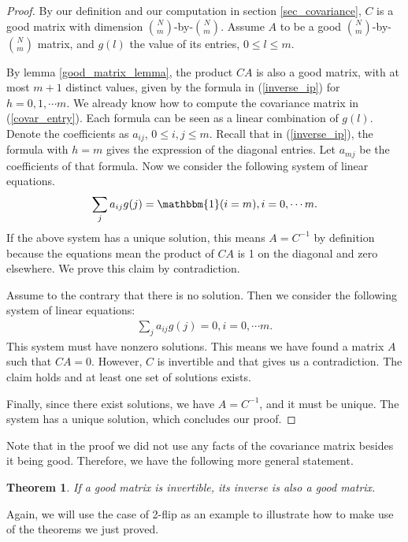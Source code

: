 \documentclass[10pt]{article}
\newtheorem{theorem}{\bf Theorem}
\newenvironment{Proof of lemma}{\noindent{\bf Proof of Lemma}}{\hfill$\Box$\newline}
\newenvironment{Proof of claim}{\noindent{\bf Proof of claim}}{\hfill$\Box$\newline}
\newenvironment{Proof of theorem}{\noindent{\bf Proof of Theorem}}{\hfill\scriptsize{$\Box$}\newline}
\newenvironment{Proof of theorems}{\noindent{\bf Proof of Theorems}}{\hfill$\Box$\newline}
\newenvironment{Proof of proposition}{\noindent{\bf Proof of Proposition}}{\hfill$\Box$\newline}
\newenvironment{Proof of propositions}{\noindent{\bf Proof of Propositions}}{\hfill$\Box$\newline}
\newenvironment{Proof of exercise}{\noindent{\it Proof of Exercise:}}{\hfill$\Box$}
\numberwithin{equation}{section}
\begin{document}
\begin{proof}
    By our definition and our computation in section \ref{sec_covariance}, $C$ is a good matrix with dimension $\binom{N}{m}$-by-$\binom{N}{m}$. Assume $A$ to be a good $\binom{N}{m}$-by-$\binom{N}{m}$ matrix, and $g(l)$ the value of its entries, $0 \leq l \leq m$.

    By lemma \ref{good_matrix_lemma}, the product $CA$ is also a good matrix, with at most $m+1$ distinct values, given by the formula in (\ref{inverse_ip}) for $h = 0,1,\cdots m$. We already know how to compute the covariance matrix in (\ref{covar_entry}). Each formula can be seen as a linear combination of $g(l)$. Denote the coefficients as $a_{ij}$, $0 \leq i,j \leq m$. Recall that in (\ref{inverse_ip}), the formula with $h=m$ gives the expression of the diagonal entries. Let $a_{mj}$ be the coefficients of that formula. Now we consider the following system of linear equations.
    \begin{align}
        \sum_{j}a_{ij}g(j) = \mathbbm{1}(i=m), i = 0, \cdots m.
    \end{align}
    If the above system has a unique solution, this means $A = C^{-1}$ by definition because the equations mean the product of $CA$ is 1 on the diagonal and zero elsewhere. We prove this claim by contradiction.
    
    Assume to the contrary that there is no solution. Then we consider the following system of linear equations:
    \begin{align}
        \sum_{j}a_{ij}g(j) = 0, i = 0, \cdots m.
    \end{align} 
    This system must have nonzero solutions. This means we have found a matrix $A$ such that $CA = 0$. However, $C$ is invertible and that gives us a contradiction. The claim holds and at least one set of solutions exists.

    Finally, since there exist solutions, we have $A = C^{-1}$, and it must be unique. The system has a unique solution, which concludes our proof. 
\end{proof}
Note that in the proof we did not use any facts of the covariance matrix besides it being good. Therefore, we have the following more general statement.
\begin{theorem}
    If a good matrix is invertible, its inverse is also a good matrix.
\end{theorem}
Again, we will use the case of 2-flip as an example to illustrate how to make use of the theorems we just proved.
\end{document}
